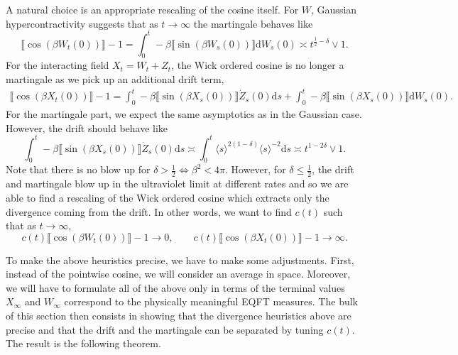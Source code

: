 \documentclass[11pt, a4paper]{scrartcl}
\numberwithin{equation}{section}
\theoremstyle{plain}
\theoremstyle{remark}
\newcommand{\mathd}{\mathrm{d}}
\begin{document}
A natural choice is an appropriate rescaling of the cosine itself. 
For $W$, Gaussian hypercontractivity suggests that as $t\to\infty$ the martingale behaves like
\[
  \llbracket \cos(\beta W_t(0))\rrbracket-1 = 
  \int_{0}^{t} -\beta\llbracket \sin(\beta W_s(0))\rrbracket\mathd W_s(0) \asymp t^{\frac{1}{2}-\delta}\vee1.
\]
For the interacting field $X_t=W_t+Z_t$, the Wick ordered cosine is no longer a martingale as we pick up
an additional drift term,
\[\begin{aligned}
  \llbracket \cos(\beta X_t(0))\rrbracket-1
  = \int_{0}^{t} -\beta\llbracket \sin(\beta X_s(0))\rrbracket\dot{Z}_s(0)\mathd s
  + \int_{0}^{t} -\beta\llbracket \sin(\beta X_s(0))\rrbracket\mathd W_s(0).
\end{aligned}
\]
For the martingale part, we expect the same asymptotics as in the Gaussian case. 
However, the drift should behave like 
\[\int_{0}^{t} -\beta\llbracket \sin(\beta X_s(0))\rrbracket\dot{Z}_s(0)\mathd s
\asymp \int_{0}^{t} \langle s\rangle^{2(1-\delta)}\langle s \rangle^{-2}\mathd s 
\asymp t^{1-2\delta}\vee 1.\]
Note that there is no blow up for $\delta>\frac{1}{2}\iff\beta^2<4\pi$. However,
for $\delta\leqslant\frac{1}{2}$, the drift and martingale blow up in 
the ultraviolet limit at  different rates and so we are able to find a rescaling of the Wick ordered 
cosine which extracts only the divergence coming from the drift. In other words, we 
want to find $c(t)$ such that as $t\to\infty$,
\[c(t)\llbracket \cos(\beta W_t(0))\rrbracket-1\to 0,\qquad 
  c(t)\llbracket \cos(\beta X_t(0))\rrbracket-1\to \infty.\]

To make the above heuristics precise, we have to make some adjustments.
First, instead of the pointwise cosine, we will consider an average in space.
Moreover, we will have to formulate all of the above only in terms of the terminal
values $X_\infty$ and $W_\infty$ correspond to the physically meaningful EQFT measures. 
The bulk of this section then consists in showing that the divergence heuristics 
above are precise and that the drift and the martingale can be separated by tuning 
$c(t)$. The result is the following theorem.
\end{document}
